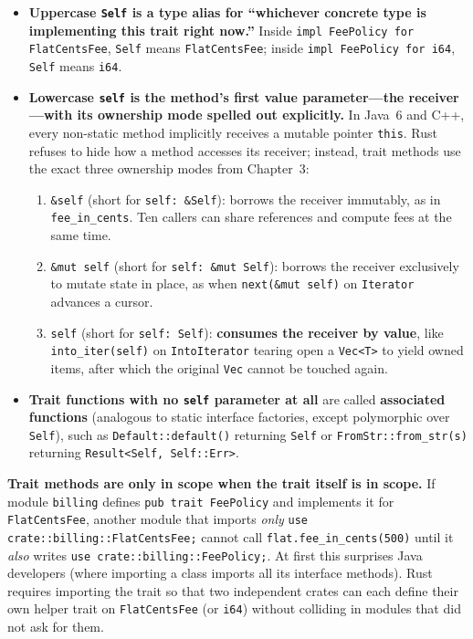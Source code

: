 \begin{itemize}
  \item \textbf{Uppercase \texttt{Self} is a type alias for ``whichever concrete type is implementing this trait right now.''} Inside \texttt{impl FeePolicy for FlatCentsFee}, \texttt{Self} means \texttt{FlatCentsFee}; inside \texttt{impl FeePolicy for i64}, \texttt{Self} means \texttt{i64}.
  \item \textbf{Lowercase \texttt{self} is the method's first value parameter---the receiver---with its ownership mode spelled out explicitly.} In Java~6 and C++, every non-static method implicitly receives a mutable pointer \texttt{this}. Rust refuses to hide how a method accesses its receiver; instead, trait methods use the exact three ownership modes from Chapter~3:
  \begin{enumerate}
    \item \texttt{\&self} (short for \texttt{self: \&Self}): borrows the receiver immutably, as in \texttt{fee\_in\_cents}. Ten callers can share references and compute fees at the same time.
    \item \texttt{\&mut self} (short for \texttt{self: \&mut Self}): borrows the receiver exclusively to mutate state in place, as when \texttt{next(\&mut self)} on \texttt{Iterator} advances a cursor.
    \item \texttt{self} (short for \texttt{self: Self}): \textbf{consumes the receiver by value}, like \texttt{into\_iter(self)} on \texttt{IntoIterator} tearing open a \texttt{Vec<T>} to yield owned items, after which the original \texttt{Vec} cannot be touched again.
  \end{enumerate}
  \item \textbf{Trait functions with no \texttt{self} parameter at all} are called \textbf{associated functions} (analogous to static interface factories, except polymorphic over \texttt{Self}), such as \texttt{Default::default()} returning \texttt{Self} or \texttt{FromStr::from\_str(s)} returning \texttt{Result<Self, Self::Err>}.
\end{itemize}

\begin{trapbox}
\textbf{Trait methods are only in scope when the trait itself is in scope.} If module \texttt{billing} defines \texttt{pub trait FeePolicy} and implements it for \texttt{FlatCentsFee}, another module that imports \emph{only} \texttt{use crate::billing::FlatCentsFee;} cannot call \texttt{flat.fee\_in\_cents(500)} until it \emph{also} writes \texttt{use crate::billing::FeePolicy;}. At first this surprises Java developers (where importing a class imports all its interface methods). Rust requires importing the trait so that two independent crates can each define their own helper trait on \texttt{FlatCentsFee} (or \texttt{i64}) without colliding in modules that did not ask for them.
\end{trapbox}

